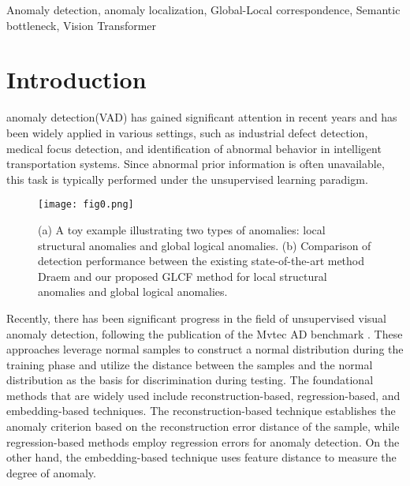 \documentclass[lettersize,journal]{IEEEtran}
\begin{document}
\begin{IEEEkeywords}
Anomaly detection, anomaly localization, Global-Local correspondence, Semantic bottleneck, Vision Transformer
\end{IEEEkeywords}

\section{Introduction}
 anomaly detection(VAD) has gained significant attention in recent years and has been widely applied in various settings, such as industrial defect detection\cite{r26}, medical focus detection\cite{r27}, and identification of abnormal behavior\cite{r6} in intelligent transportation systems. Since abnormal prior information is often unavailable, this task is typically performed under the unsupervised learning paradigm.

\begin{figure}[t]\centering
\texttt{[image: fig0.png]}
\caption{(a) A toy example illustrating two types of anomalies: local structural anomalies and global logical anomalies. (b) Comparison of detection performance between the existing state-of-the-art method Draem \cite{r20} and our proposed GLCF method for local structural anomalies and global logical anomalies.}
\label{FIG1}
\end{figure}

Recently, there has been significant progress in the field of unsupervised visual anomaly detection, following the publication of the Mvtec AD benchmark \cite{r28}. These approaches leverage normal samples to construct a normal distribution during the training phase and utilize the distance between the samples and the normal distribution as the basis for discrimination during testing. The foundational methods that are widely used include reconstruction-based\cite{r2}, regression-based\cite{r12}, and embedding-based\cite{r21} techniques. The reconstruction-based technique establishes the anomaly criterion based on the reconstruction error distance of the sample, while regression-based methods employ regression errors for anomaly detection. On the other hand, the embedding-based technique uses feature distance to measure the degree of anomaly.
\end{document}

